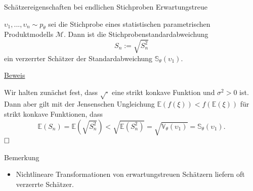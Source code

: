 \documentclass[
  8pt,
  ignorenonframetext,
]{beamer}
\providecommand{\tightlist}{%
  \setlength{\itemsep}{0pt}\setlength{\parskip}{0pt}}
\newcommand{\ups} {\upsilon}
\begin{document}
\begin{frame}{\small Schätzereigenschaften bei endlichen Stichproben
\textbar{} Erwartungstreue}
\protect\hypertarget{schuxe4tzereigenschaften-bei-endlichen-stichproben-erwartungstreue-5}{}
\small
\begin{theorem}
\justifying
\normalfont
$\ups_1,...,\ups_n \sim p_\theta$ sei die Stichprobe eines statistischen parametrischen
Produktmodells $\mathcal{M}$.  Dann ist die Stichprobenstandardabweichung
\begin{equation}
S_n := \sqrt{S^2_n}
\end{equation}
ein verzerrter Schätzer der Standardabweichung $\mathbb{S}_\theta(\ups_1)$.
\end{theorem}

\footnotesize

\underline{Beweis}

Wir halten zunächst fest, dass \(\sqrt{\cdot}\) eine strikt konkave
Funktion und \(\sigma^2 > 0\) ist. Dann aber gilt mit der Jensenschen
Ungleichung \(\mathbb{E}(f(\xi)) < f(\mathbb{E}(\xi))\) für strikt
konkave Funktionen, dass \begin{equation}
\mathbb{E}(S_n)
= \mathbb{E}\left(\sqrt{S^2_n}\right)
< \sqrt{\mathbb{E}(S^2_n)}
= \sqrt{\mathbb{V}_\theta(\ups_1)}
= \mathbb{S}_\theta(\ups_1).
\end{equation} \(\hfill \Box\)

Bemerkung

\begin{itemize}
\tightlist
\item
  Nichtlineare Transformationen von erwartungstreuen Schätzern liefern
  oft verzerrte Schätzer.
\end{itemize}
\end{frame}
\end{document}
